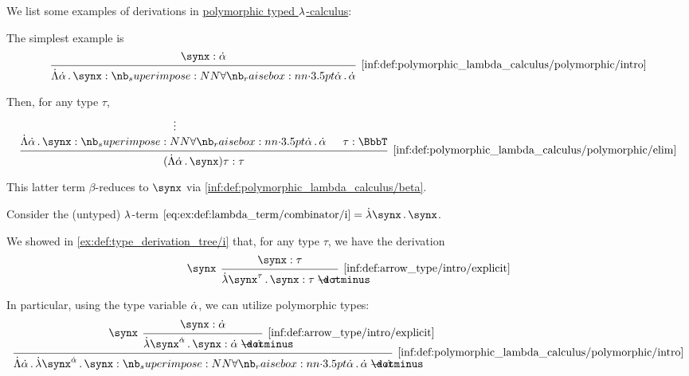 \begin{example}\label{ex:def:polymorphic_typed_lambda_calculus}
  We list some examples of derivations in \hyperref[def:polymorphic_typed_lambda_calculus]{polymorphic typed \( {\mathrm \lambda} \)-calculus}:
  \begin{thmenum}
     The simplest example is
    \begin{equation*}
      \begin{prooftree}
        \hypo{ \synx: \syn\alpha }
        \infer1[\ref{inf:def:polymorphic_lambda_calculus/polymorphic/intro}]{ \qAbs {\syn\alpha} \synx: \qpolytype {\syn\alpha} \syn\alpha }
      \end{prooftree}
    \end{equation*}

    Then, for any type \( \tau \),
    \begin{equation*}
      \begin{prooftree}
        \hypo{}
        \ellipsis {} { \qAbs {\syn\alpha} \synx: \qpolytype {\syn\alpha} \syn\alpha }

        \hypo{ \tau: \BbbT }

        \infer2[\ref{inf:def:polymorphic_lambda_calculus/polymorphic/elim}]{ (\qAbs {\syn\alpha} \synx) \tau: \tau }.
      \end{prooftree}
    \end{equation*}

    This latter term \( \beta \)-reduces to \( \synx \) via \ref{inf:def:polymorphic_lambda_calculus/beta}.

     Consider the (untyped) \( {\mathrm \lambda} \)-term \( \ref{eq:ex:def:lambda_term/combinator/i} = \qabs \synx \synx \).

    We showed in \cref{ex:def:type_derivation_tree/i} that, for any type \( \tau \), we have the derivation
    \begin{equation*}
      \begin{prooftree}
        \hypo{ \synx: \tau }
        \infer[left label=\( \synx \)]1[\ref{inf:def:arrow_type/intro/explicit}]{ \qabs {\synx^\tau} \synx: \tau \synimplies \tau }
      \end{prooftree}
    \end{equation*}

    In particular, using the type variable \( \dot{\alpha} \), we can utilize polymorphic types:
    \begin{equation*}
      \begin{prooftree}
        \hypo{ \synx: \syn\alpha }
        \infer[left label=\( \synx \)]1[\ref{inf:def:arrow_type/intro/explicit}]{ \qabs {\synx^{\syn\alpha}} \synx: \syn\alpha \synimplies \syn\alpha }
        \infer1[\ref{inf:def:polymorphic_lambda_calculus/polymorphic/intro}]{ \qAbs {\syn\alpha} \qabs {\synx^{\syn\alpha}} \synx: \qpolytype {\syn\alpha} \syn\alpha \synimplies \syn\alpha }
      \end{prooftree}
    \end{equation*}


\end{thmenum}
\end{example}
